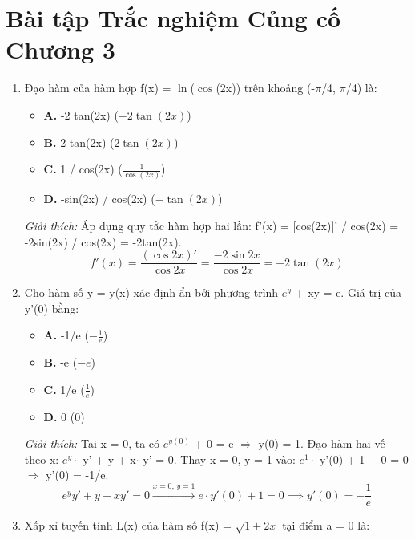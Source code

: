 \documentclass[11pt,a4paper,oneside]{book}
\begin{document}
\section{Bài tập Trắc nghiệm Củng cố Chương 3}
\begin{enumerate}[label=\textbf{Câu \arabic*:}, leftmargin=2.2em, itemsep=8pt]
  \item Đạo hàm của hàm hợp f(x) = $\ln$($\cos$(2x)) trên khoảng (-$\pi$/4, $\pi$/4) là:
  \begin{itemize}[label={}, leftmargin=1em, itemsep=2pt]
    \item \textbf{A.} -2 tan(2x) \quad ($-2\tan(2x)$)
    \item \textbf{B.} 2 tan(2x) \quad ($2\tan(2x)$)
    \item \textbf{C.} 1 / cos(2x) \quad ($\frac{1}{\cos(2x)}$)
    \item \textbf{D.} -sin(2x) / cos(2x) \quad ($-\tan(2x)$)
  \end{itemize}
  \vspace{2pt}
   \textit{Giải thích:} Áp dụng quy tắc hàm hợp hai lần: f'(x) = [cos(2x)]' / cos(2x) = -2sin(2x) / cos(2x) = -2tan(2x).
  \[ f'(x) = \frac{(\cos 2x)'}{\cos 2x} = \frac{-2\sin 2x}{\cos 2x} = -2\tan(2x) \]
  \item Cho hàm số y = y(x) xác định ẩn bởi phương trình $e^y$ + xy = e. Giá trị của y'(0) bằng:
  \begin{itemize}[label={}, leftmargin=1em, itemsep=2pt]
    \item \textbf{A.} -1/e \quad ($-\frac{1}{e}$)
    \item \textbf{B.} -e \quad ($-e$)
    \item \textbf{C.} 1/e \quad ($\frac{1}{e}$)
    \item \textbf{D.} 0 \quad ($0$)
  \end{itemize}
  \vspace{2pt}
   \textit{Giải thích:} Tại x = 0, ta có $e^{y(0)}$ + 0 = e $\Rightarrow$  y(0) = 1. Đạo hàm hai vế theo x: $e^y \cdot$  y' + y + x$\cdot$ y' = 0. Thay x = 0, y = 1 vào: $e^1 \cdot$  y'(0) + 1 + 0 = 0 $\Rightarrow$  y'(0) = -1/e.
  \[ e^y y' + y + xy' = 0 \xrightarrow{x=0,\,y=1} e \cdot y'(0) + 1 = 0 \implies y'(0) = -\frac{1}{e} \]
  \item Xấp xỉ tuyến tính L(x) của hàm số f(x) = $\sqrt{1 + 2x}$ tại điểm a = 0 là:
  \begin{itemize}[label={}, leftmargin=1em, itemsep=2pt]

\end{itemize}
\end{enumerate}
\end{document}
